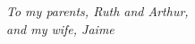 \begin{dedication}
\null\vfil
\begin{center}
    \emph{
    To my parents, Ruth and Arthur,\\
    and my wife, Jaime
}
\end{center}
\vfil\null
\end{dedication}
